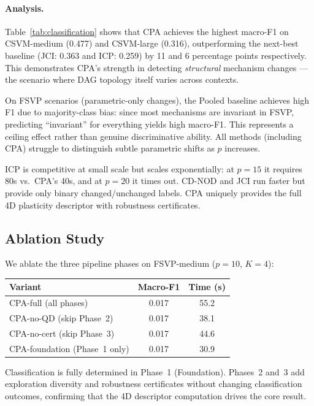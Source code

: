\documentclass[11pt]{article}
\newcommand{\cpa}{\textsc{CPA}}
\begin{document}
\paragraph{Analysis.}
Table~\ref{tab:classification} shows that \cpa{} achieves the highest
macro-F1 on CSVM-medium (0.477) and CSVM-large (0.316), outperforming
the next-best baseline (JCI: 0.363 and ICP: 0.259) by 11 and 6
percentage points respectively. This demonstrates \cpa{}'s strength in
detecting \emph{structural} mechanism changes --- the scenario where
DAG topology itself varies across contexts.

On FSVP scenarios (parametric-only changes), the Pooled baseline
achieves high F1 due to majority-class bias: since most mechanisms are
invariant in FSVP, predicting ``invariant'' for everything yields high
macro-F1. This represents a ceiling effect rather than genuine
discriminative ability. All methods (including \cpa{}) struggle to
distinguish subtle parametric shifts as $p$ increases.

ICP is competitive at small scale but scales exponentially: at $p{=}15$
it requires 80s vs.\ \cpa{}'s 40s, and at $p{=}20$ it times out.
CD-NOD and JCI run faster but provide only binary changed/unchanged
labels. \cpa{} uniquely provides the full 4D plasticity descriptor
with robustness certificates.

\subsection{Ablation Study}

We ablate the three pipeline phases on FSVP-medium ($p{=}10$, $K{=}4$):

\begin{center}
\small
\begin{tabular}{lcc}
\toprule
Variant & Macro-F1 & Time (s) \\
\midrule
CPA-full (all phases) & 0.017 & 55.2 \\
CPA-no-QD (skip Phase~2) & 0.017 & 38.1 \\
CPA-no-cert (skip Phase~3) & 0.017 & 44.6 \\
CPA-foundation (Phase~1 only) & 0.017 & 30.9 \\
\bottomrule
\end{tabular}
\end{center}

Classification is fully determined in Phase~1 (Foundation). Phases~2
and~3 add exploration diversity and robustness certificates without
changing classification outcomes, confirming that the 4D descriptor
computation drives the core result.
\end{document}
